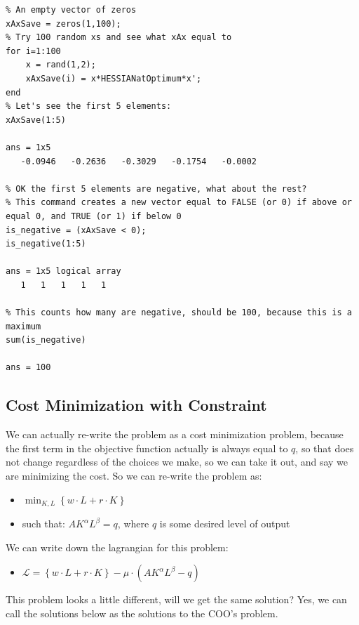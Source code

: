 \documentclass[
]{book}
\providecommand{\tightlist}{%
  \setlength{\itemsep}{0pt}\setlength{\parskip}{0pt}}
\begin{document}
\begin{verbatim}
% An empty vector of zeros
xAxSave = zeros(1,100);
% Try 100 random xs and see what xAx equal to
for i=1:100
    x = rand(1,2);
    xAxSave(i) = x*HESSIANatOptimum*x';
end
% Let's see the first 5 elements:
xAxSave(1:5)

ans = 1x5    
   -0.0946   -0.2636   -0.3029   -0.1754   -0.0002

% OK the first 5 elements are negative, what about the rest?
% This command creates a new vector equal to FALSE (or 0) if above or equal 0, and TRUE (or 1) if below 0
is_negative = (xAxSave < 0);
is_negative(1:5)

ans = 1x5 logical array    
   1   1   1   1   1

% This counts how many are negative, should be 100, because this is a maximum
sum(is_negative)

ans = 100
\end{verbatim}

\hypertarget{cost-minimization-with-constraint}{%
\subsection{Cost Minimization with Constraint}\label{cost-minimization-with-constraint}}

We can actually re-write the problem as a cost minimization problem,
because the first term in the objective function actually is always
equal to \(q\), so that does not change regardless of the choices we make,
so we can take it out, and say we are minimizing the cost. So we can
re-write the problem as:

\begin{itemize}
\item
  \(\displaystyle \min_{K,L} \left\lbrace w\cdot L+r\cdot K\right\rbrace\)
\item
  such that: \(AK^{\alpha } L^{\beta } =q\), where \(q\) is some desired
  level of output
\end{itemize}

We can write down the lagrangian for this problem:

\begin{itemize}
\tightlist
\item
  \(\displaystyle \mathcal{L}=\left\lbrace w\cdot L+r\cdot K\right\rbrace -\mu \cdot (AK^{\alpha } L^{\beta } -q)\)
\end{itemize}

This problem looks a little different, will we get the same solution?
Yes, we can call the solutions below as the solutions to the COO's
problem.
\end{document}
